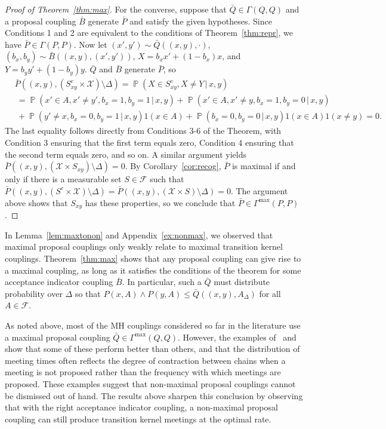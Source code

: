 \documentclass[aihp]{imsart}
\theoremstyle{plain}
\theoremstyle{remark}
\theoremstyle{definition} \newtheorem{example}{Example}
\newcommand{\eq}[1]{\begin{align*}#1\end{align*}} %
\renewcommand{\P}{\operatorname{\mathbb{P}}}
\newcommand{\scrF}{\mathscr{F}}
\newcommand{\calX}{\mathcal{X}}
\newcommand{\cd}{\cdot}
\newcommand{\g}{\, | \,}
\newcommand{\bp}{\bar P}
\newcommand{\bq}{\bar Q}
\newcommand{\bb}{\bar B}
\newcommand{\sm}{\setminus}
\newcommand{\xy}{(x,y)}
\newcommand{\xyp}{(x',y')}
\newcommand{\bxy}{(b_x,b_y)}
\newcommand{\Gmax}{\Gamma^\mathrm{max}}
\begin{document}
\begin{proof}[Proof of Theorem~\ref{thm:max}]
For the converse, suppose that $\bq \in \Gamma(Q,Q)$ and a proposal coupling $\bb$ generate $\bp$
and satisfy the given hypotheses. Since Conditions 1 and 2 are equivalent to the conditions of
Theorem~\ref{thm:repr}, we have $\bp \in \Gamma(P,P)$. Now let $\xyp \sim \bq(\xy,\cd)$, $\bxy \sim
\bb(\xy,\xyp)$, $X = b_x x' + (1-b_x) x$, and $Y= b_y y' + (1-b_y) y$. $\bq$ and $\bb$ generate
$\bp$, so
\eq{
	& \bp(\xy, (S_{xy}^c \times \calX) \sm \Delta) = \P(X \in S_{xy}^c, X \neq Y \g x,y) \\
	& \  = \P(x' \in A, x' \neq y', b_x=1, b_y=1 \g x,y) + \P(x' \in A, x' \neq y, b_x=1, b_y=0 \g x,y) \\
	& \  + \P(y' \neq x, b_x=0, b_y=1 \g x,y) 1(x \in A) + \P(b_x=0, b_y=0 \g x,y) 1(x \in A) 1(x \neq y) = 0.
}
The last equality follows directly from Conditions 3-6 of the Theorem, with Condition 3 ensuring
that the first term equals zero, Condition 4 ensuring that the second term equals zero, and so on. A
similar argument yields ${\bp(\xy, (\calX \times S_{xy} ) \sm \Delta) = 0}$. By
Corollary~\ref{cor:recog}, $\bp$ is maximal if and only if there is a measurable set $S \in \scrF$
such that $\bp(\xy, (S^c \times \calX) \sm \Delta ) = \bp(\xy, (\calX \times S) \sm \Delta ) = 0$.
The argument above shows that $S_{xy}$ has these properties, so we conclude that $\bp \in
\Gmax(P,P)$.
\end{proof}

In Lemma~\ref{lem:maxtonon} and Appendix~\ref{ex:nonmax}, we observed that maximal proposal
couplings only weakly relate to maximal transition kernel couplings. Theorem~\ref{thm:max} shows
that any proposal coupling can give rise to a maximal coupling, as long as it satisfies the
conditions of the theorem for some acceptance indicator coupling $\bb$. In particular, such a $\bq$
must distribute probability over $\Delta$ so that $P(x, A) \wedge P(y, A) \leq \bq(\xy, A_\Delta)$
for all $A \in \scrF$.

As noted above, most of the MH couplings considered so far in the literature use a maximal proposal
coupling ${ \bq \in \Gmax(Q,Q) }$. However, the examples of~\citet{Jacob2020} and
\citet{o2021couplings} show that some of these perform better than others, and that the distribution
of meeting times often reflects the degree of contraction between chains when a meeting is not
proposed rather than the frequency with which meetings are proposed. These examples suggest that
non-maximal proposal couplings cannot be dismissed out of hand. The results above sharpen this
conclusion by observing that with the right acceptance indicator coupling, a non-maximal proposal
coupling can still produce transition kernel meetings at the optimal rate.
\end{document}
